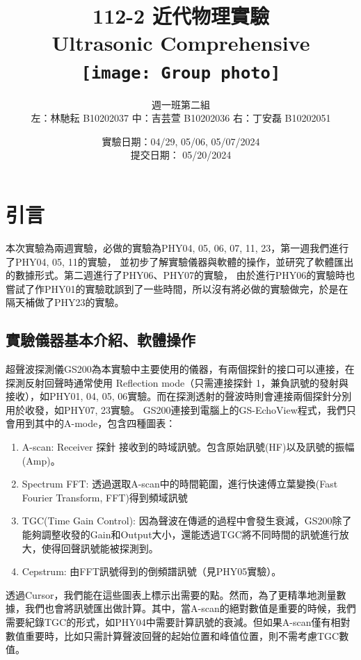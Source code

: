 \documentclass[12pt]{report}
\title{112-2 近代物理實驗\\Ultrasonic Comprehensive\\\vspace{1cm}
\texttt{[image: Group photo]}
}
\author{週一班第二組 \\ 左：林馳耘 B10202037 中：吉芸萱 B10202036 右：丁安磊 B10202051}
\date{實驗日期：04/29, 05/06, 05/07/2024\\提交日期： 05/20/2024}
\begin{document}
\renewcommand{\figurename}{圖}
\renewcommand{\tablename}{表}
\newcommand{\br}[1]{\left(#1\right)}
\renewcommand{\vb}[1]{\boldsymbol{\mathbf{#1}}} %

\maketitle

\tableofcontents

\clearpage


\chapter{引言}

本次實驗為兩週實驗，必做的實驗為PHY04, 05, 06, 07, 11, 23，第一週我們進行了PHY04, 05, 11的實驗，
並初步了解實驗儀器與軟體的操作，並研究了軟體匯出的數據形式。第二週進行了PHY06、PHY07的實驗，
由於進行PHY06的實驗時也嘗試了作PHY01的實驗耽誤到了一些時間，所以沒有將必做的實驗做完，於是在隔天補做了PHY23的實驗。

\section{實驗儀器基本介紹、軟體操作}

超聲波探測儀GS200為本實驗中主要使用的儀器，有兩個探針的接口可以連接，在探測反射回聲時通常使用 Reflection mode（只需連接探針 1，兼負訊號的發射與接收），如PHY01, 04, 05, 06實驗。而在探測透射的聲波時則會連接兩個探針分別用於收發，如PHY07, 23實驗。
GS200連接到電腦上的GS-EchoView程式，我們只會用到其中的A-mode，包含四種圖表：
\begin{enumerate}
\item A-scan: Receiver 探針 接收到的時域訊號。包含原始訊號(HF)以及訊號的振幅(Amp)。
\item Spectrum FFT: 透過選取A-scan中的時間範圍，進行快速傅立葉變換(Fast Fourier Transform, FFT)得到頻域訊號
\item TGC(Time Gain Control): 因為聲波在傳遞的過程中會發生衰減，GS200除了能夠調整收發的Gain和Output大小，還能透過TGC將不同時間的訊號進行放大，使得回聲訊號能被探測到。
\item Cepstrum: 由FFT訊號得到的倒頻譜訊號（見PHY05實驗）。
\end{enumerate}
透過Cursor，我們能在這些圖表上標示出需要的點。然而，為了更精準地測量數據，我們也會將訊號匯出做計算。其中，當A-scan的絕對數值是重要的時候，我們需要紀錄TGC的形式，如PHY04中需要計算訊號的衰減。但如果A-scan僅有相對數值重要時，比如只需計算聲波回聲的起始位置和峰值位置，則不需考慮TGC數值。
\end{document}
